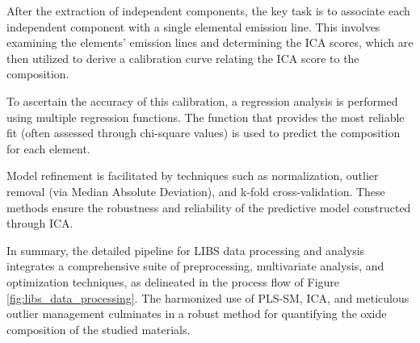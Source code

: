 After the extraction of independent components, the key task is to associate each independent component with a single elemental emission line. This involves examining the elements' emission lines and determining the ICA scores, which are then utilized to derive a calibration curve relating the ICA score to the composition.

To ascertain the accuracy of this calibration, a regression analysis is performed using multiple regression functions. The function that provides the most reliable fit (often assessed through chi-square values) is used to predict the composition for each element.

Model refinement is facilitated by techniques such as normalization, outlier removal (via Median Absolute Deviation), and k-fold cross-validation. These methods ensure the robustness and reliability of the predictive model constructed through ICA.

In summary, the detailed pipeline for LIBS data processing and analysis integrates a comprehensive suite of preprocessing, multivariate analysis, and optimization techniques, as delineated in the process flow of Figure \ref{fig:libs_data_processing}.
The harmonized use of PLS-SM, ICA, and meticulous outlier management culminates in a robust method for quantifying the oxide composition of the studied materials.